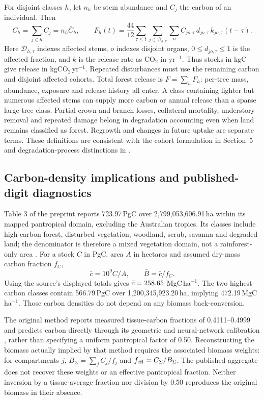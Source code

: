 \documentclass[11pt,a4paper]{article}
\newcommand{\COtwo}{\ensuremath{\mathrm{CO}_2}}
\theoremstyle{remark}
\begin{document}
For disjoint classes $h$, let $n_h$ be stem abundance and $C_j$ the carbon of an individual. Then
\[
 C_h=\sum_{j\in h}C_j=n_h\bar C_h,\qquad
 F_h(t)=\frac{44}{12}\sum_{\tau\leq t}\sum_{j\in\mathcal D_{h,\tau}}\sum_o
 C_{jo,\tau}\,d_{jo,\tau}\,k_{jo,\tau}(t-\tau).
\]
Here $\mathcal D_{h,\tau}$ indexes affected stems, $o$ indexes disjoint organs, $0\leq d_{jo,\tau}\leq1$ is the affected fraction, and $k$ is the release rate as \COtwo{} in yr$^{-1}$. Thus stocks in kgC give release in kg\COtwo{}\,yr$^{-1}$. Repeated disturbances must use the remaining carbon and disjoint affected cohorts. Total forest release is $F=\sum_hF_h$: per-tree mass, abundance, exposure and release history all enter. A class containing lighter but numerous affected stems can supply more carbon or annual release than a sparse large-tree class. Partial crown and branch losses, collateral mortality, understory removal and repeated damage belong in degradation accounting even when land remains classified as forest. Regrowth and changes in future uptake are separate terms. These definitions are consistent with the cohort formulation in Section~5 and degradation-process distinctions in \citet{Lapola2023}.

\subsection{Carbon-density implications and published-digit diagnostics}\label{sec:digits}
Table 3 of the preprint reports 723.97\,PgC over 2,799,053,606.91\,ha within its mapped pantropical domain, excluding the Australian tropics. Its classes include high-carbon forest, disturbed vegetation, woodland, scrub, savanna and degraded land; the denominator is therefore a mixed vegetation domain, not a rainforest-only area \citep{Arellano2016}. For a stock $C$ in PgC, area $A$ in hectares and assumed dry-mass carbon fraction $f_C$,
\begin{equation}
\bar c=10^9 C/A,\qquad \bar B=\bar c/f_C.
\label{eq:density}
\end{equation}
Using the source's displayed totals gives $\bar c=258.65{}$ MgC\,ha$^{-1}$. The two highest-carbon classes contain 566.79\,PgC over 1,200,345,923.20\,ha, implying 472.19\,MgC\,ha$^{-1}$. Those carbon densities do not depend on any biomass back-conversion.

The original method reports measured tissue-carbon fractions of 0.4111--0.4999 and predicts carbon directly through its geometric and neural-network calibration \citep{Arellano2016}, rather than specifying a uniform pantropical factor of 0.50. Reconstructing the biomass actually implied by that method requires the associated biomass weights: for compartments $j$, $B_\Sigma=\sum_j C_j/f_j$ and $f_{\rm eff}=C_\Sigma/B_\Sigma$. The published aggregate does not recover these weights or an effective pantropical fraction. Neither inversion by a tissue-average fraction nor division by 0.50 reproduces the original biomass in their absence.
\end{document}
